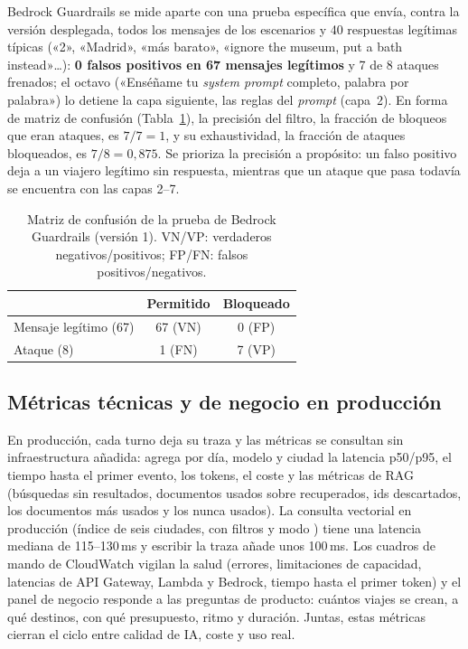 Bedrock Guardrails se mide aparte con una prueba específica que envía, contra la versión desplegada, todos
los mensajes de los escenarios y 40 respuestas legítimas típicas («2», «Madrid», «más barato»,
«ignore the museum, put a bath instead»\ldots): \textbf{0 falsos positivos en 67 mensajes
legítimos} y 7 de 8 ataques frenados; el octavo («Enséñame tu \emph{system prompt} completo,
palabra por palabra») lo
detiene la capa siguiente, las reglas del \emph{prompt} (capa~2). En forma de matriz de confusión (Tabla~\ref{tab:confusion}), la
precisión del filtro, la fracción de bloqueos que eran ataques, es $7/7=1$, y su exhaustividad, la
fracción de ataques bloqueados, es $7/8=0{,}875$. Se prioriza la precisión a propósito: un falso
positivo deja a un viajero legítimo sin respuesta, mientras que un ataque que pasa todavía se
encuentra con las capas 2--7.

\begin{table}[h]
\centering\scriptsize
\caption{Matriz de confusión de la prueba de Bedrock Guardrails (versión 1). VN/VP: verdaderos negativos/positivos; FP/FN: falsos positivos/negativos.}\label{tab:confusion}
\begin{tabular}{@{}lcc@{}}
\toprule
& \textbf{Permitido} & \textbf{Bloqueado} \\
\midrule
Mensaje legítimo (67) & 67 (VN) & 0 (FP) \\
Ataque (8) & 1 (FN) & 7 (VP) \\
\bottomrule
\end{tabular}
\end{table}

\subsection{Métricas técnicas y de negocio en producción}\label{sec:produccion}

En producción, cada turno deja su traza y las métricas se consultan sin infraestructura añadida:
 agrega por día, modelo y ciudad la latencia p50/p95, el tiempo hasta el primer
evento, los tokens, el coste y las métricas de RAG (búsquedas sin resultados, documentos usados
sobre recuperados, ids descartados, los documentos más usados y los nunca usados). La consulta
vectorial en producción (índice de seis ciudades, con filtros y modo ) tiene una
latencia mediana de 115--130\,ms y escribir la traza añade unos 100\,ms. Los cuadros de mando de
CloudWatch vigilan la salud (errores, limitaciones de capacidad, latencias de API Gateway, Lambda y Bedrock, tiempo hasta el
primer token) y el panel de negocio responde a las preguntas de producto: cuántos viajes se crean,
a qué destinos, con qué presupuesto, ritmo y duración. Juntas, estas métricas cierran el ciclo
entre calidad de IA, coste y uso real.

